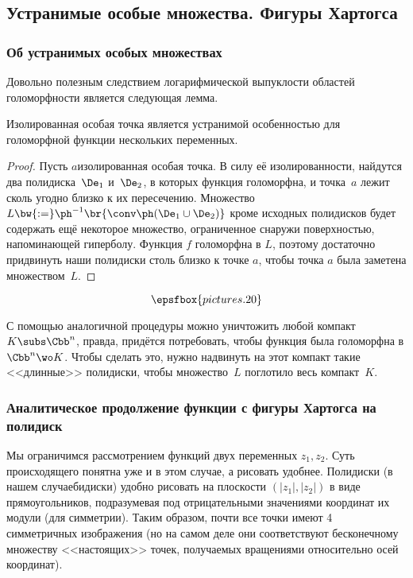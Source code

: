 \documentclass[a4paper]{article}
\begin{document}
\subsection{Устранимые особые множества. Фигуры Хартогса}

\subsubsection{Об устранимых особых множествах}

Довольно полезным следствием логарифмической выпуклости областей голоморфности является
следующая лемма.

\begin{lemma}
Изолированная особая точка является устранимой особенностью для голоморфной функции
нескольких переменных.
\end{lemma}
\begin{proof}
Пусть $a$\т изолированная особая точка. В силу её изолированности, найдутся два
полидиска~$\De_1$ и~$\De_2$, в которых функция голоморфна, и точка~$a$ лежит сколь
угодно близко к их пересечению. Множество $L \bw{:=} \ph^{-1}\br{\conv\ph(\De_1 \cup \De_2)}$
кроме исходных полидисков будет содержать ещё некоторое множество, ограниченное снаружи
поверхностью, напоминающей гиперболу. Функция $f$ голоморфна в $L$, поэтому достаточно
придвинуть наши полидиски столь близко к точке $a$, чтобы точка $a$ была заметена множеством~$L$.
\end{proof}

$$\epsfbox{pictures.20}$$

\begin{note}
С помощью аналогичной процедуры можно уничтожить любой компакт $K \subs \Cbb^n$, правда,
придётся потребовать, чтобы функция была голоморфна в $\Cbb^n \wo K$. Чтобы сделать это,
нужно надвинуть на этот компакт такие <<длинные>> полидиски, чтобы множество~$L$ поглотило
весь компакт~$K$.
\end{note}

\subsubsection{Аналитическое продолжение функции с фигуры Хартогса на полидиск}

Мы ограничимся рассмотрением функций двух переменных $z_1,z_2$. Суть происходящего понятна уже
и в этом случае, а рисовать удобнее. Полидиски (в нашем случае\т бидиски) удобно рисовать на плоскости
$(|z_1|, |z_2|)$ в виде прямоугольников, подразумевая под отрицательными значениями координат их модули
(для симметрии). Таким образом, почти все точки имеют 4 симметричных изображения (но на самом деле они
соответствуют бесконечному множеству <<настоящих>> точек, получаемых вращениями относительно осей координат).
\end{document}
